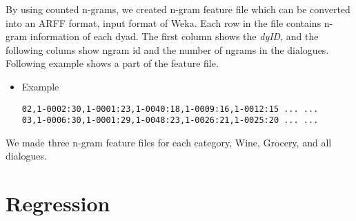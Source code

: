 \documentclass[11pt]{article} %
\begin{document}
\begin{itemize}
By using counted n-grams, we created n-gram feature file which can be converted into an ARFF format, input format of Weka. Each row in the file contains n-gram information of each dyad. The first column shows the \textit{dyID}, and the following colums show ngram id and the number of ngrams in the dialogues. Following example shows a part of the feature file.
\begin{itemize}
\item Example
\begin{verbatim}
02,1-0002:30,1-0001:23,1-0040:18,1-0009:16,1-0012:15 ... ...
03,1-0006:30,1-0001:29,1-0048:23,1-0026:21,1-0025:20 ... ...
\end{verbatim}
\end{itemize}
We made three n-gram feature files for each category, Wine, Grocery, and all dialogues.
\end{itemize}




\section{Regression}
\end{document}
